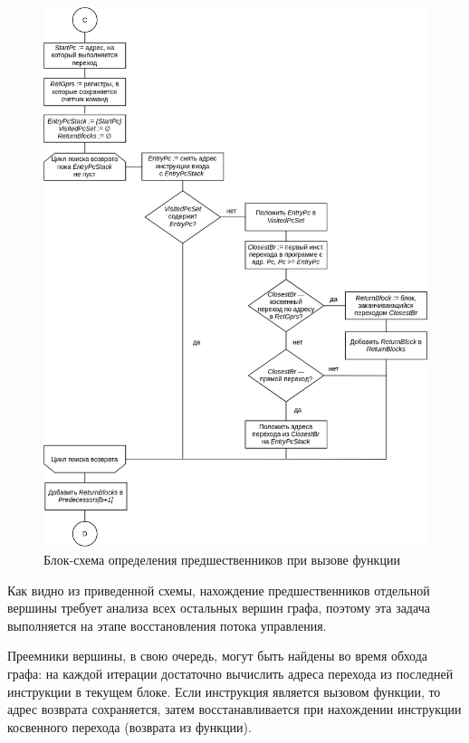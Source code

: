 \documentclass[a4paper,14pt]{extarticle}
\begin{document}
{\begin{figure}[H]
\centering
\includegraphics[width=\textwidth]{diagrams/alg-cfg-call}
\caption{Блок-схема определения предшественников при вызове функции}
\label{fig:diagram-cfg-call}
\end{figure}

Как видно из приведенной схемы, нахождение предшественников отдельной вершины
требует анализа всех остальных вершин графа, поэтому эта задача выполняется
на этапе восстановления потока управления.

Преемники вершины, в свою очередь, могут быть найдены во время обхода графа:
на каждой итерации достаточно вычислить адреса перехода из последней инструкции в текущем блоке.
Если инструкция является вызовом функции, то адрес возврата сохраняется, затем восстанавливается
при нахождении инструкции косвенного перехода (возврата из функции).

}
\end{document}
